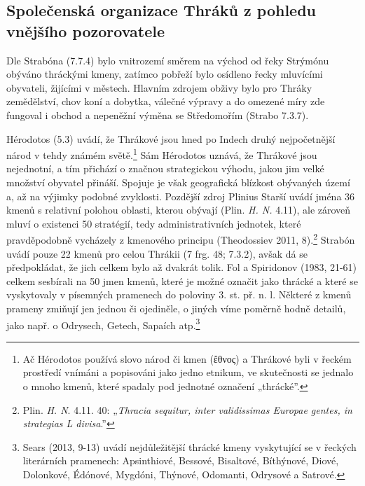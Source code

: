 \subsection[společenská-organizace-thráků-z-pohledu-vnějšího-pozorovatele]{Společenská organizace Thráků z pohledu vnějšího pozorovatele}

Dle Strabóna (7.7.4) bylo vnitrozemí směrem na východ od řeky Strýmónu obýváno thráckými kmeny, zatímco pobřeží bylo osídleno řecky mluvícími obyvateli, žijícími v městech. Hlavním zdrojem obživy bylo pro Thráky zemědělství, chov koní a dobytka, válečné výpravy a do omezené míry zde fungoval i obchod a nepeněžní výměna se Středomořím (Strabo 7.3.7).

Hérodotos (5.3) uvádí, že Thrákové jsou hned po Indech druhý nejpočetnější národ v tehdy známém světě.\footnote{Ač Hérodotos používá slovo národ či kmen (ἔθνος) a Thrákové byli v řeckém prostředí vnímáni a popisováni jako jedno etnikum, ve skutečnosti se jednalo o mnoho kmenů, které spadaly pod jednotné označení „thrácké”.} Sám Hérodotos uznává, že Thrákové jsou nejednotní, a tím přichází o značnou strategickou výhodu, jakou jim velké množství obyvatel přináší. Spojuje je však geografická blízkost obývaných území a, až na výjimky podobné zvyklosti. Pozdější zdroj Plinius Starší uvádí jména 36 kmenů s relativní polohou oblasti, kterou obývají (Plin. {\em H. N.} 4.11), ale zároveň mluví o existenci 50 stratégií, tedy administrativních jednotek, které pravděpodobně vycházely z kmenového principu (Theodossiev 2011, 8).\footnote{Plin. {\em H. N}. 4.11. 40: „{\em Thracia sequitur, inter validissimas Europae gentes, in strategias L divisa}.”} Strabón uvádí pouze 22 kmenů pro celou Thrákii (7 frg. 48; 7.3.2), avšak dá se předpokládat, že jich celkem bylo až dvakrát tolik. Fol a Spiridonov (1983, 21-61) celkem sesbírali na 50 jmen kmenů, které je možné označit jako thrácké a které se vyskytovaly v písemných pramenech do poloviny 3. st. př. n. l. Některé z kmenů prameny zmiňují jen jednou či ojediněle, o jiných víme poměrně hodně detailů, jako např. o Odrysech, Getech, Sapaích atp.\footnote{Sears (2013, 9-13) uvádí nejdůležitější thrácké kmeny vyskytující se v řeckých literárních pramenech: Apsinthiové, Bessové, Bisaltové, Bíthýnové, Diové, Dolonkové, Édónové, Mygdóni, Thýnové, Odomanti, Odrysové a Satrové.}


